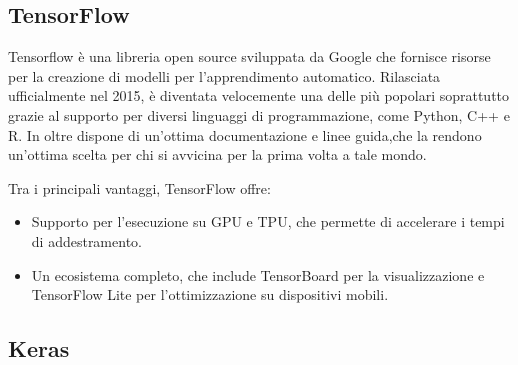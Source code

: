 \subsection{TensorFlow}
\begin{figure}  %
    \setlength{\fboxsep}{1pt} %
    \setlength{\fboxrule}{0pt} %
\end{figure}

Tensorflow \cite{Framework_AnalyticsVidhya,Framework_VisoAI,Framework_Devopedia} è una libreria open source sviluppata da Google che fornisce risorse per la creazione di modelli per l’apprendimento automatico.  
Rilasciata ufficialmente nel 2015, è diventata velocemente una delle più popolari soprattutto grazie 
al supporto per diversi linguaggi di programmazione, come Python, C++ e R.
In oltre dispone di un'ottima documentazione e linee guida,che la rendono un’ottima scelta per chi si avvicina per la prima volta a tale mondo.  

Tra i principali vantaggi, TensorFlow offre:
\begin{itemize}
    \item Supporto per l’esecuzione su GPU e TPU, che permette di accelerare i tempi di addestramento.
    \item Un ecosistema completo, che include TensorBoard per la visualizzazione e TensorFlow Lite per l’ottimizzazione su dispositivi mobili.
\end{itemize}
\aftergroup
\par
\subsection{Keras}
\begin{figure}  %
    \setlength{\fboxsep}{2pt} %
    \setlength{\fboxrule}{0pt} %
\end{figure}

